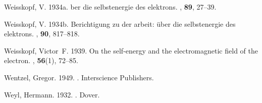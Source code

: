 \documentclass[12pt,secnumarabic,amsmath,amssymb,balancelastpage,nofootinbib]{article}
\newcommand{\noop}[1]{}
\begin{document}
\begin{thebibliography}{}
Weisskopf, V. 1934a.
\newblock {\noop{AAA}}{\"U}ber die selbstenergie des elektrons.
, {\bf 89}, 27--39.

Weisskopf, V. 1934b.
\newblock Berichtigung zu der arbeit: {\"u}ber die selbstenergie des elektrons.
, {\bf 90}, 817--818.

Weisskopf, Victor~F. 1939.
\newblock On the self-energy and the electromagnetic field of the electron.
, {\bf 56}(1), 72--85.

Wentzel, Gregor. 1949.
.
\newblock Interscience Publishers.

Weyl, Hermann. 1932.
.
\newblock Dover.

\end{thebibliography}
\end{document}
